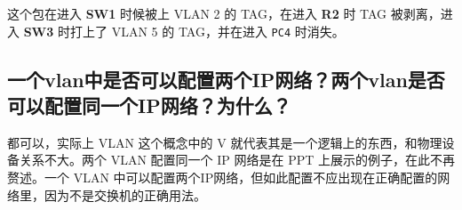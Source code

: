\documentclass[black,normal,cn]{elegantnote}
\begin{document}
这个包在进入 \textbf{SW1} 时候被上 VLAN 2 的 TAG，在进入 \textbf{R2} 时 TAG 被剥离，进入 \textbf{SW3} 时打上了 VLAN 5 的 TAG，并在进入 \texttt{PC4} 时消失。

\subsection{一个vlan中是否可以配置两个IP网络？两个vlan是否可以配置同一个IP网络？为什么？}

都可以，实际上 VLAN 这个概念中的 V 就代表其是一个逻辑上的东西，和物理设备关系不大。两个 VLAN 配置同一个 IP 网络是在 PPT 上展示的例子，在此不再赘述。一个 VLAN 中可以配置两个IP网络，但如此配置不应出现在正确配置的网络里，因为不是交换机的正确用法。
\end{document}
